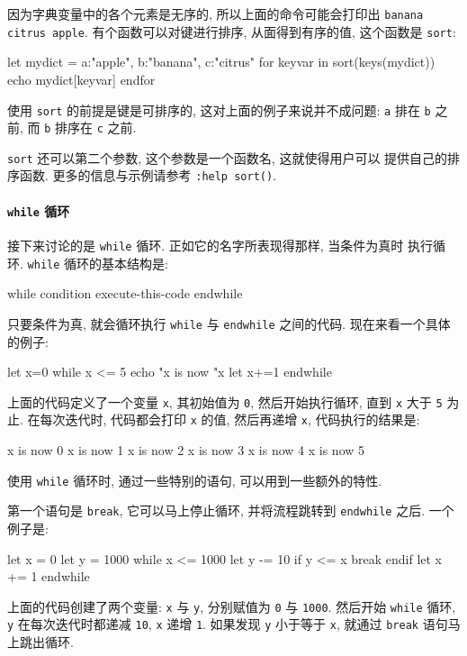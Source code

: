 因为字典变量中的各个元素是无序的, 所以上面的命令可能会打印出 \texttt{banana
citrus apple}. 有个函数可以对键进行排序, 从面得到有序的值, 这个函数是
\texttt{sort}:
\begin{vimcode}
let mydict = {a:"apple", b:"banana", c:"citrus" }
for keyvar in sort(keys(mydict))
    echo mydict[keyvar]
endfor
\end{vimcode}
使用 \texttt{sort} 的前提是键是可排序的, 这对上面的例子来说并不成问题:
\texttt{a} 排在 \texttt{b} 之前, 而 \texttt{b} 排序在 \texttt{c} 之前.

\begin{warning}
    \texttt{sort} 还可以第二个参数, 这个参数是一个函数名, 这就使得用户可以
    提供自己的排序函数. 更多的信息与示例请参考 \texttt{:help sort()}.
\end{warning}

\paragraph{\texttt{while} 循环}
\label{para:while_loops}

接下来讨论的是 \texttt{while} 循环. 正如它的名字所表现得那样, 当条件为真时
执行循环. \texttt{while} 循环的基本结构是:
\begin{vimcode}
while condition
    execute-this-code
endwhile
\end{vimcode}
只要条件为真, 就会循环执行 \texttt{while} 与 \texttt{endwhile} 之间的代码.
现在来看一个具体的例子:
\begin{vimcode}
let x=0
while x <= 5
    echo "x is now "x
    let x+=1
endwhile
\end{vimcode}
上面的代码定义了一个变量 \texttt{x}, 其初始值为 \texttt{0}, 然后开始执行循环,
直到 \texttt{x} 大于 \texttt{5} 为止. 在每次迭代时, 代码都会打印 \texttt{x}
的值, 然后再递增 \texttt{x}, 代码执行的结果是:
\begin{vimcode}
x is now 0
x is now 1
x is now 2
x is now 3
x is now 4
x is now 5
\end{vimcode}

使用 \texttt{while} 循环时, 通过一些特别的语句, 可以用到一些额外的特性.

第一个语句是 \texttt{break}, 它可以马上停止循环, 并将流程跳转到
\texttt{endwhile} 之后. 一个例子是:
\begin{vimcode}
let x = 0
let y = 1000
while x <= 1000
    let y -= 10
    if y <= x
        break
    endif
    let x += 1
endwhile
\end{vimcode}
上面的代码创建了两个变量: \texttt{x} 与 \texttt{y}, 分别赋值为 \texttt{0}
与 \texttt{1000}. 然后开始 \texttt{while} 循环, \texttt{y} 在每次迭代时都递减
\texttt{10}, \texttt{x} 递增 \texttt{1}. 如果发现 \texttt{y} 小于等于
\texttt{x}, 就通过 \texttt{break} 语句马上跳出循环.

